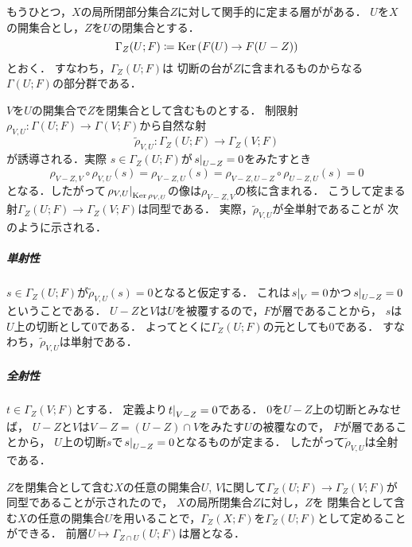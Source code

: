 もうひとつ，\(X\)の局所閉部分集合\(Z\)に対して関手的に定まる層ががある．
\(U\)を\(X\)の開集合とし，\(Z\)を\(U\)の閉集合とする．
\begin{equation}
    \Gamma_Z(U;F)\coloneqq
    \Ker\left(F(U)\to F(U-Z)\right)
\end{equation}
とおく．
すなわち，\(\Gamma_Z(U;F)\)は
切断の台が\(Z\)に含まれるものからなる\(\Gamma(U;F)\)の部分群である．

\(V\)を\(U\)の開集合で\(Z\)を閉集合として含むものとする．
制限射\(
    \rho_{V,U}\colon\Gamma(U;F)\to\Gamma(V;F)
\)から自然な射\[
    \widetilde{\rho}_{V,U}\colon
    \Gamma_Z(U;F)\to\Gamma_Z(V;F)
\]が誘導される．実際
\(s\in\Gamma_Z(U;F)\)が\(\mres[s]{U-Z}=0\)をみたすとき
\[
    \rho_{V-Z,V}\circ\rho_{V,U}(s)
    =\rho_{V-Z,U}(s)
    =\rho_{V-Z,U-Z}\circ\rho_{U-Z,U}(s)
    =0
\]となる．したがって\(
    \mres[\rho_{V,U}]{\Ker\rho_{V,U}}
\)の像は\(\rho_{V-Z,V}\)の核に含まれる．
こうして定まる射\(\Gamma_Z(U;F)\to\Gamma_Z(V;F)\)は同型である．
実際，\(\widetilde{\rho}_{V,U}\)が全単射であることが
次のように示される．
\subparagraph*{単射性}
\(s\in\Gamma_Z(U;F)\)が\(
    \widetilde{\rho}_{V,U}(s)=0
\)となると仮定する．
これは\(\mres[s]{V}=0\)かつ\(\mres[s]{U-Z}=0\)ということである．
\(U-Z\)と\(V\)は\(U\)を被覆するので，\(F\)が層であることから，
\(s\)は\(U\)上の切断として\(0\)である．
よってとくに\(\Gamma_Z(U;F)\)の元としても\(0\)である．
すなわち，\(\widetilde{\rho}_{V,U}\)は単射である．
\subparagraph*{全射性}
\(t\in\Gamma_Z(V;F)\)とする．
定義より\(\mres[t]{V-Z}=0\)である．
\(0\)を\(U-Z\)上の切断とみなせば，
\(U-Z\)と\(V\)は\(V-Z=(U-Z)\cap V\)をみたす\(U\)の被覆なので，
\(F\)が層であることから，
\(U\)上の切断\(s\)で\(\mres[s]{U-Z}=0\)となるものが定まる．
したがって\(\widetilde{\rho}_{V,U}\)は全射である．

\(Z\)を閉集合として含む\(X\)の任意の開集合\(U\), \(V\)に関して\(
    \Gamma_Z(U;F)\to\Gamma_Z(V;F)
\)が同型であることが示されたので，
\(X\)の局所閉集合\(Z\)に対し，\(Z\)を
閉集合として含む\(X\)の任意の開集合\(U\)を用いることで，\(
    \Gamma_Z(X;F)
\)を\(\Gamma_Z(U;F)\)として定めることができる．
前層\(U\mapsto\Gamma_{Z\cap U}(U;F)\)は層となる．

